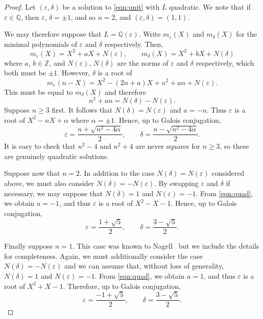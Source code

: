 \documentclass{amsart}
\newcommand{\Q}{\mathbb{Q}}
\newcommand{\Z}{\mathbb{Z}}
\theoremstyle{definition}
\theoremstyle{remark}
\begin{document}
\begin{proof}
Let $(\varepsilon,\delta)$ be a solution to \eqref{eqn:unit} with $L$ quadratic.
We note that if $\varepsilon \in \Q$, then $\varepsilon$, $\delta = \pm 1$, and so $n=2$,
	and $(\varepsilon,\delta)=(1,1)$.

We may therefore suppose that $L=\Q(\varepsilon)$. Write $m_\varepsilon(X)$ and $m_\delta(X)$
for the minimal polynomials of $\varepsilon$ and $\delta$ respectively. 
	Then,
	\[
		m_\varepsilon(X)=X^2+aX+N(\varepsilon), \qquad m_\delta(X)=X^2+bX+N(\delta)
	\]
	where $a$, $b \in \Z$, and $N(\varepsilon)$, $N(\delta)$ are the norms of $\varepsilon$
	and $\delta$ respectively, which both must be $\pm 1$. However, $\delta$ is a root
	of 
	\[
		m_\varepsilon(n-X)=X^2-(2n+a)X+n^2+an+N(\varepsilon).
	\]
	This must be equal to $m_\delta(X)$ and therefore
	\begin{equation}\label{eqn:quad}
		n^2+an=N(\delta)-N(\varepsilon).
	\end{equation}
	Suppose $n \ge 3$ first. It follows that $N(\delta)=N(\varepsilon)$ and $a=-n$.
	Thus $\varepsilon$ is a root of $X^2-nX+\alpha$ where $\alpha=\pm 1$. Hence, up to
	Galois conjugation,
	\[
		\varepsilon=\frac{n + \sqrt{n^2-4 \alpha}}{2}, 
		\qquad
		\delta=\frac{n - \sqrt{n^2-4 \alpha}}{2}. 
	\]
	It is easy to check that $n^2-4$ and $n^2+4$ are never squares for $n \ge 3$, so these are genuinely quadratic
	solutions.

	Suppose now that $n=2$. In addition to the case $N(\delta)=N(\varepsilon)$ considered
	above, we must also consider $N(\delta)=-N(\varepsilon)$. By swapping $\varepsilon$
	and $\delta$ if necessary, we may suppose that $N(\delta)=1$ and $N(\varepsilon)=-1$. 
	From \eqref{eqn:quad}, we obtain $a=-1$, and thus $\varepsilon$ is a root of $X^2-X-1$.
	Hence, up to Galois conjugation, 
	\[
		\varepsilon=\frac{1+\sqrt{5}}{2}, \qquad \delta=\frac{3-\sqrt{5}}{2}.
	\]

	Finally suppose $n=1$. This case was known to Nagell~\cite[Section 2]{Nagell2} but we include 
	the details for completeness. Again, we must additionally consider the case $N(\delta)=-N(\varepsilon)$ 
	and we can assume that, without loss of generality, $N(\delta)=1$ and $N(\varepsilon)=-1$. 
	From \eqref{eqn:quad}, we obtain $a=1$, and thus $\varepsilon$ is a root of $X^2+X-1$. 
	Therefore, up to Galois conjugation,
	\[
		\varepsilon=\frac{-1+\sqrt{5}}{2}, \qquad \delta=\frac{3-\sqrt{5}}{2}.
	\]

\end{proof}
\end{document}
